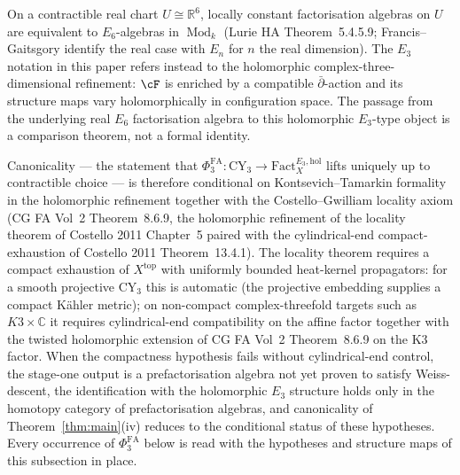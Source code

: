 \documentclass[11pt,reqno]{amsart}
\theoremstyle{plain}
\theoremstyle{definition}
\theoremstyle{remark}
\DeclareMathOperator{\Mod}{Mod}
\newcommand{\Cbb}{\mathbb{C}}
\newcommand{\Rbb}{\mathbb{R}}
\begin{document}
On a contractible real chart $U \cong \Rbb^6$, locally constant
factorisation algebras on $U$ are equivalent to $E_6$-algebras in
$\Mod_k$ (Lurie HA Theorem~5.4.5.9; Francis--Gaitsgory identify the
real case with $E_n$ for $n$ the real dimension). The $E_3$ notation in
this paper refers instead to the holomorphic complex-three-dimensional
refinement: $\cF$ is enriched by a compatible $\bar\partial$-action and
its structure maps vary holomorphically in configuration space. The
passage from the underlying real $E_6$ factorisation algebra to this
holomorphic $E_3$-type object is a comparison theorem, not a formal
identity.

Canonicality --- the statement that $\Phi^{\mathrm{FA}}_3 : \mathrm{CY}_3 \to \mathrm{Fact}^{E_3, \mathrm{hol}}_X$ lifts uniquely up to contractible choice --- is therefore conditional on Kontsevich--Tamarkin formality in the holomorphic refinement together with the Costello--Gwilliam locality axiom (CG FA Vol~2 Theorem~8.6.9, the holomorphic refinement of the locality theorem of Costello 2011 Chapter~5 paired with the cylindrical-end compact-exhaustion of Costello 2011 Theorem~13.4.1). The locality theorem requires a compact exhaustion of $X^{\mathrm{top}}$ with uniformly bounded heat-kernel propagators: for a smooth projective $\mathrm{CY}_3$ this is automatic (the projective embedding supplies a compact Kähler metric); on non-compact complex-threefold targets such as $K3 \times \Cbb$ it requires cylindrical-end compatibility on the affine factor together with the twisted holomorphic extension of CG FA Vol~2 Theorem~8.6.9 on the K3 factor. When the compactness hypothesis fails without cylindrical-end control, the stage-one output is a prefactorisation algebra not yet proven to satisfy Weiss-descent, the identification with the holomorphic $E_3$ structure holds only in the homotopy category of prefactorisation algebras, and canonicality of Theorem~\ref{thm:main}(iv) reduces to the conditional status of these hypotheses. Every occurrence of $\Phi^{\mathrm{FA}}_3$ below is read with the hypotheses and structure maps of this subsection in place.
\end{document}
